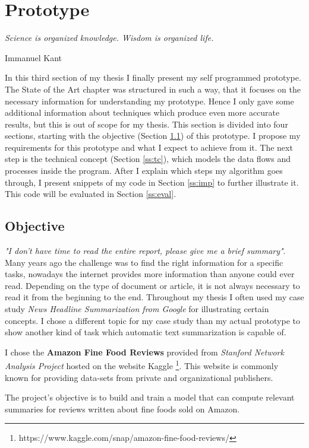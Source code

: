 \chapter{Prototype}\label{ch:proto}

\epigraph{\textit{Science is organized knowledge. Wisdom is organized life.}}{Immanuel Kant}

In this third section of my thesis I finally present my self programmed prototype. The State of the Art chapter was structured in such a way, that it focuses on the necessary information for understanding my prototype. Hence I only gave some additional information about techniques which produce even more accurate results, but this is out of scope for my thesis. This section is divided into four sections, starting with the objective (Section \ref{ss:obj}) of this prototype. I propose my requirements for this prototype and what I expect to achieve from it. The next step is the technical concept (Section \ref{ss:tc}), which models the data flows and processes inside the program. After I explain which steps my algorithm goes through, I present snippets of my code in Section \ref{ss:imp} to further illustrate it. This code will be evaluated in Section \ref{ss:eval}.

\section{Objective}\label{ss:obj}

\textit{"I don't have time to read the entire report, please give me a brief summary"}. Many years ago the challenge was to find the right information for a specific tasks, nowadays the internet provides more information than anyone could ever read. Depending on the type of document or article, it is not always necessary to read it from the beginning to the end. Throughout my thesis I often used my case study \textit{News Headline Summarization from Google} for illustrating certain concepts. I chose a different topic for my case study than my actual prototype to show another kind of task which automatic text summarization is capable of.

I chose the \textbf{Amazon Fine Food Reviews} provided from \textit{Stanford Network Analysis Project} hosted on the website Kaggle \footnote{https://www.kaggle.com/snap/amazon-fine-food-reviews/}. This website is commonly known for providing data-sets from private and organizational publishers. 

The project's objective is to build and train a model that can compute relevant summaries for reviews written about fine foods sold on Amazon. 


